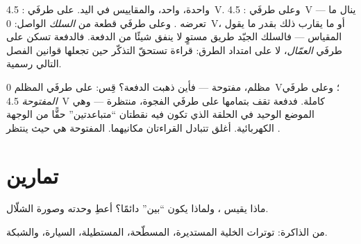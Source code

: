 \begin{example}\label{ex:g8:voltage-voltmeter:readings}
 واحدة،  واحد، والمقاييس في اليد. على طرفَي
: \qty{4.5}{V}. وعلى طرفَي : \qty{4.5}{V} ---
 ينال ما تعرضه . وعلى طرفَي قطعة من
\emph{السلك} الواصل: \qty{0}{V}، أو ما يقارب ذلك بقدر ما يقول
المقياس --- فالسلك الجيّد طريق مستوٍ لا ينفق شيئًا من الدفعة.
فالدفعة تسكن على طرفَي \emph{العمّال}، لا على امتداد الطرق:
قراءة تستحقّ التذكّر حين تجعلها قوانين الفصل التالي رسمية.
\end{example}

\begin{example}\label{ex:g8:voltage-voltmeter:openswitch}
 مظلم،  مفتوحة --- فأين ذهبت الدفعة؟ قِس: على
طرفَي  المظلم \qty{0}{V}؛ وعلى طرفَي \emph{
المفتوحة} \qty{4.5}{V} كاملة. فدفعة  تقف بتمامها على
طرفَي الفجوة، منتظرة --- وهي الموضع الوحيد في الحلقة الذي
تكون فيه نقطتان ``متباعدتين'' حقًّا من الوجهة الكهربائية.
أغلق  تتبادل القراءتان مكانيهما.  المفتوحة هي
حيث ينتظر .
\end{example}

\section{تمارين}

\begin{exercise}[$\star$]\label{exo:g8:voltage-voltmeter:1}
ماذا يقيس ، ولماذا يكون ``بين'' دائمًا؟ أعطِ وحدته وصورة
الشلّال.
\end{exercise}

\begin{exercise}[$\star$]\label{exo:g8:voltage-voltmeter:2}
من الذاكرة: توترات الخلية المستديرة،  المسطّحة،
 المستطيلة،  السيارة، والشبكة.
\end{exercise}

